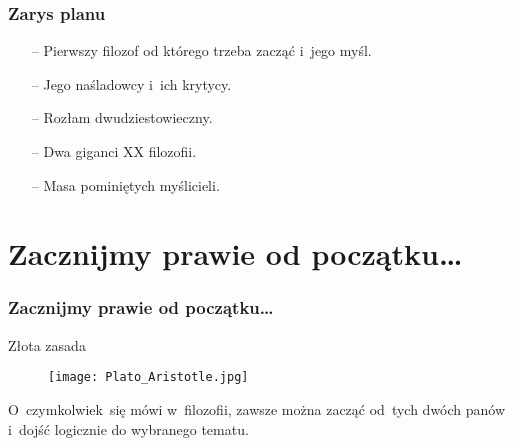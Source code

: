 \documentclass{beamer}  %
\begin{document}
\begin{frame}
  \frametitle{Zarys planu}

  \begin{block}{}
    \begin{itemize}
    \item[--] Pierwszy filozof od którego trzeba zacząć i~jego myśl.
    \item[--] Jego naśladowcy i~ich krytycy.
    \item[--] Rozłam dwudziestowieczny.
    \item[--] Dwa giganci XX filozofii.
    \item[--] Masa pominiętych myślicieli.
    \end{itemize}
  \end{block}

\end{frame}





\section[]{Zacznijmy prawie od początku\ldots}


\begin{frame}
  \frametitle{Zacznijmy prawie od początku\ldots}

  \begin{block}{Złota zasada}
    \begin{figure}
      \centering

      \texttt{[image: Plato\_Aristotle.jpg]}

    \end{figure}
  \end{block}

  \begin{block}{}
    O~czymkolwiek~się mówi w~filozofii, zawsze można zacząć od~tych
    dwóch panów i~dojść logicznie do wybranego tematu.
  \end{block}
\end{frame}
\end{document}
